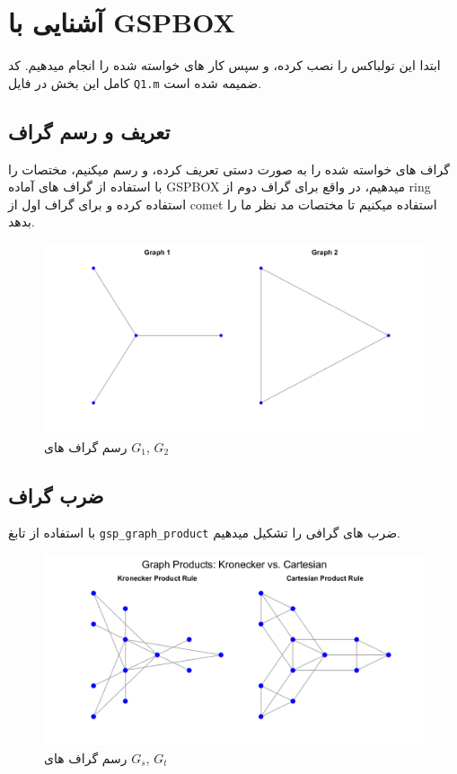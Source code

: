 \section{آشنایی با \textsc{GSPBOX}}

ابتدا این تولباکس را نصب کرده، و سپس کار های خواسته شده را انجام میدهیم.
کد کامل این بخش در فایل \texttt{Q1.m} ضمیمه شده است.
\subsection{تعریف و رسم گراف}

گراف های خواسته شده را به صورت دستی تعریف کرده، و رسم میکنیم،
مختصات را با استفاده از گراف های آماده GSPBOX میدهیم، در واقع برای گراف دوم از ring استفاده کرده
و برای گراف اول از comet استفاده میکنیم تا مختصات مد نظر ما را بدهد.

\begin{figure}[h]
	\centering
	\includegraphics*[width=0.7\linewidth]{../results/Q1/graphs.png}
	\caption{رسم گراف های $G_1$, $G_2$}
\end{figure}

\subsection{ضرب گراف}

با استفاده از تابغ \texttt{gsp\_graph\_product} ضرب های گرافی را تشکیل میدهیم.

\begin{figure}[h]
	\centering
	\includegraphics*[width=0.7\linewidth]{../results/Q1/graph_products.png}
	\caption{رسم گراف های $G_s$, $G_t$}
	\label{fig:products}
\end{figure}

